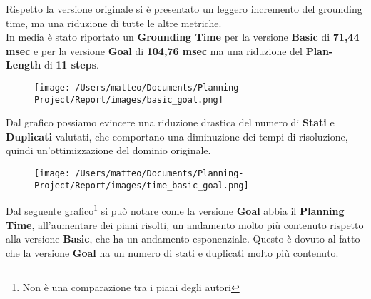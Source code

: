 \documentclass{article}
\begin{document}
\noindent
Rispetto la versione originale si è presentato un leggero incremento del grounding time, ma una riduzione di tutte le altre metriche.\\
In media è stato riportato un \textbf{Grounding Time} per la versione \textbf{Basic} di \textbf{71,44 msec} e per la versione \textbf{Goal} di \textbf{104,76 msec} ma una riduzione del \textbf{Plan-Length} di \textbf{11 steps}.
\begin{figure}[H]
    \centering
    \texttt{[image: /Users/matteo/Documents/Planning-Project/Report/images/basic\_goal.png]}
    \label{fig:goal}
\end{figure}
\noindent
Dal grafico possiamo evincere una riduzione drastica del numero di \textbf{Stati} e \textbf{Duplicati} valutati,
 che comportano una diminuzione dei tempi di risoluzione, quindi un'ottimizzazione del dominio originale.
\begin{figure}[H]
    \centering
    \texttt{[image: /Users/matteo/Documents/Planning-Project/Report/images/time\_basic\_goal.png]}
    \label{fig:goal_states}
\end{figure}
\noindent
Dal seguente grafico\footnote{Non è una comparazione tra i piani degli autori} si può notare come la versione \textbf{Goal} abbia il \textbf{Planning Time}, all'aumentare dei piani risolti, 
un andamento molto più contenuto rispetto alla versione \textbf{Basic}, che ha un andamento esponenziale. Questo è dovuto al fatto che la versione \textbf{Goal} ha un numero di stati e duplicati molto più contenuto.
\end{document}

